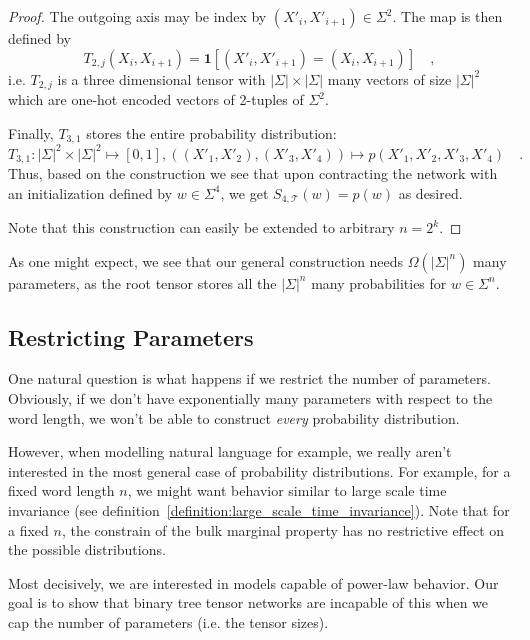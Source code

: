 \documentclass[../../main.tex]{subfiles}
\begin{document}
\begin{proof}
    \pagebreak
    
    The outgoing axis may be index by $(X'_i, X'_{i + 1}) \in \Sigma^2$. The map is then defined by
    \[
        T_{2, j}(X_i, X_{i + 1}) = \bm{1}[(X'_i, X'_{i + 1}) = (X_i, X_{i + 1})] \quad ,
    \]
    i.e. $T_{2, j}$ is a three dimensional tensor with $|\Sigma| \times |\Sigma|$ many vectors of size $|\Sigma|^2$ which are one-hot encoded vectors of 2-tuples of $\Sigma^2$.

    Finally, $T_{3, 1}$ stores the entire probability distribution:
    \[
        T_{3, 1}: |\Sigma|^2 \times |\Sigma|^2 \mapsto [0, 1], ((X'_1, X'_2), (X'_3, X'_4)) \mapsto p(X'_1, X'_2, X'_3, X'_4) \quad .
    \]
    Thus, based on the construction we see that upon contracting the network with an initialization defined by $w \in \Sigma^4$, we get $S_{4, \mathcal{T}}(w) = p(w)$ as desired.

    Note that this construction can easily be extended to arbitrary $n = 2^k$.
    \end{proof}

    As one might expect, we see that our general construction needs $\Omega(|\Sigma|^n)$ many parameters, as the root tensor stores all the $|\Sigma|^n$ many probabilities for $w \in \Sigma^n$.

\subsection{Restricting Parameters}
    One natural question is what happens if we restrict the number of parameters. Obviously, if we don't have exponentially many parameters with respect to the word length, we won't be able to construct \emph{every} probability distribution.

    However, when modelling natural language for example, we really aren't interested in the most general case of probability distributions. For example, for a fixed word length $n$, we might want behavior similar to large scale time invariance (see definition~\ref{definition:large_scale_time_invariance}). Note that for a fixed $n$, the constrain of the bulk marginal property has no restrictive effect on the possible distributions.

    Most decisively, we are interested in models capable of power-law behavior. Our goal is to show that binary tree tensor networks are incapable of this when we cap the number of parameters (i.e. the tensor sizes).
\end{document}
